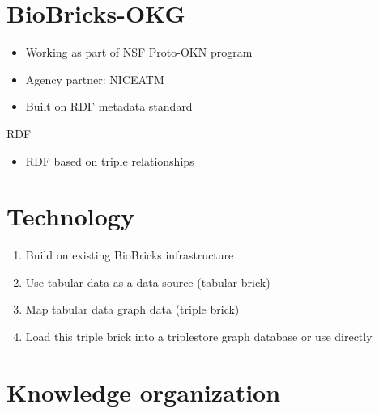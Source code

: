 \documentclass{beamer}
\def\labelenumi{\theenumi}
\begin{document}
\section{BioBricks-OKG}
\begin{frame}{\secname}
	\begin{itemize}
		\item Working as part of NSF Proto-OKN program
		\pause
		\item Agency partner: NICEATM
		\pause
		\item Built on RDF metadata standard
	\end{itemize}
\end{frame}

\begin{frame}[fragile]{RDF}
  \begin{itemize}
  \item RDF based on triple relationships
  \end{itemize}
  \begin{figure}[tbp]
   \centering
   \resizebox{0.4\textwidth}{!}{}
  \label{fig:rdf}
  \end{figure}
\end{frame}

\section{Technology}
\begin{frame}{\secname}
  \begin{enumerate}
  \def\labelenumi{\arabic{enumi}.}
  \item Build on existing BioBricks infrastructure
  \item Use tabular data as a data source (tabular brick)
  \item Map tabular data graph data (triple brick)
  \item Load this triple brick into a triplestore
  graph database or use directly
  \end{enumerate}
\end{frame}

\section{Knowledge organization}
\begin{frame}[fragile]{\secname}
        \begin{figure}[tbp]%
        \centering%
        \end{figure}
\end{frame}
\end{document}

